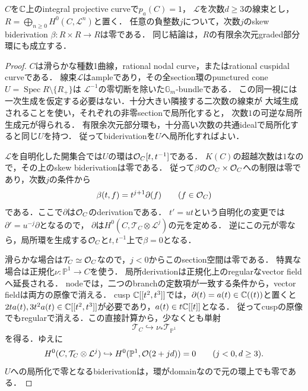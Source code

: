 \documentclass[11pt,a4paper]{ltjsarticle}
\begin{document}
\begin{lemma}[種数1のsection環の負次数双微分]\label{lem:v7-negative-biderivations}
$C$を$\mathbb C$上のintegral projective curveで$p_a(C)=1$，
$\mathcal L$を次数$d\geq3$の線束とし，
$R=\bigoplus_{n\geq0}H^0(C,\mathcal L^n)$と置く．
任意の負整数$j$について，次数$j$のskew biderivation
$\beta:R\times R\to R$は零である．
同じ結論は，$R$の有限余次元graded部分環にも成立する．
\end{lemma}
\begin{proof}
$C$は滑らかな種数1曲線，rational nodal curve，またはrational cuspidal curveである．
線束$\mathcal L$はampleであり，その全section環のpunctured cone $U=\operatorname{Spec}R\setminus\{R_+\}$は
$\mathcal L^{-1}$の零切断を除いた$\mathbb G_m$-bundleである．
この同一視には一次生成を仮定する必要はない．十分大きい隣接する二次数の線束が
大域生成されることを使い，それぞれの非零sectionで局所化すると，
次数$1$の可逆な局所生成元が得られる．
有限余次元部分環も，十分高い次数の共通idealで局所化すると同じ$U$を持つ．
従ってbiderivationを$U$へ局所化すればよい．

$\mathcal L$を自明化した開集合では$U$の環は$\mathcal O_C[t,t^{-1}]$である．
$K(C)$の超越次数は$1$なので，その上のskew biderivationは零である．
従って$\beta$の$\mathcal O_C\times\mathcal O_C$への制限は零であり，次数$j$の条件から
\[
 \beta(t,f)=t^{j+1}\partial(f)\qquad(f\in\mathcal O_C)
\]
である．ここで$\partial$は$\mathcal O_C$のderivationである．
$t'=ut$という自明化の変更では$\partial'=u^{-j}\partial$となるので，
$\partial$は$H^0(C,\mathcal T_C\otimes\mathcal L^j)$の元を定める．
逆にこの元が零なら，局所環を生成する$\mathcal O_C$と$t,t^{-1}$上で$\beta=0$となる．

滑らかな場合は$\mathcal T_C\simeq\mathcal O_C$なので，$j<0$からこのsection空間は零である．
特異な場合は正規化$\nu:\mathbb P^1\to C$を使う．
局所derivationは正規化上のregularなvector fieldへ延長される．
nodeでは，二つのbranchの定数項が一致する条件から，vector fieldは両方の原像で消える．
cusp $\mathbb C[[t^2,t^3]]$では，$\partial(t)=a(t)\in\mathbb C((t))$と置くと
$2ta(t),3t^2a(t)\in\mathbb C[[t^2,t^3]]$が必要であり，$a(t)\in t\mathbb C[[t]]$となる．
従ってcuspの原像でもregularで消える．この直接計算から，少なくとも単射
\[
 \mathcal T_C\hookrightarrow\nu_*\mathcal T_{\mathbb P^1}
\]
を得る．ゆえに
\[
 H^0(C,\mathcal T_C\otimes\mathcal L^j)
 \hookrightarrow H^0(\mathbb P^1,\mathcal O(2+jd))=0
 \qquad(j<0, d\geq3).
\]
$U$への局所化で零となるbiderivationは，環がdomainなので元の環上でも零である．
\end{proof}
\end{document}

